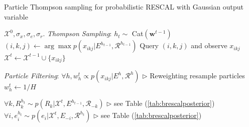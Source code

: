 \begin{algorithm}[t!]
   \caption{Particle Thompson sampling for probabilistic RESCAL with Gaussian output variable}
   \label{alg:smc}
\begin{algorithmic}
    $\mathcal{X}^{0}, \sigma_x, \sigma_e, \sigma_r$.
   \STATE \textit{Thompson Sampling}:
   \STATE $h_t \sim $ Cat$(\mathbf{w}^{t-1})$
   \STATE $(i,k,j) \leftarrow \arg\max p(x_{ikj}| E^{h_{t-1}}, \mathcal{R}^{h_{t-1}})$
   \STATE Query $(i,k,j)$ and observe $x_{ikj}$
   \STATE $\mathcal{X}^{t} \leftarrow \mathcal{X}^{t-1} \cup \{x_{ikj}\}$

   \STATE \textit{Particle Filtering}:
   \STATE $\forall h, w_h^{t} \propto p(x_{ikj} | E^{h}, \mathcal{R}^{h})$   \hfill $\triangleright$ Reweighting
   \STATE resample particles
   \STATE $w_h^{t} \leftarrow 1/H$
   \ENDIF

   \STATE $\forall k, R_k^{h_t} \sim p(R_k | \mathcal{X}^{t}, E^{h_{t-1}}, \mathcal{R}_{-k})$   \hfill $\triangleright$ see Table (\ref{tab:brescalposterior})
   \STATE $\forall i, e^{h_t}_i \sim p(e_i | \mathcal{X}^{t}, E_{-i}, \mathcal{R}^{h_{t}})$ \hfill $\triangleright$ see Table (\ref{tab:brescalposterior})
   \ENDFOR

   \ENDFOR
\end{algorithmic}
\end{algorithm}
